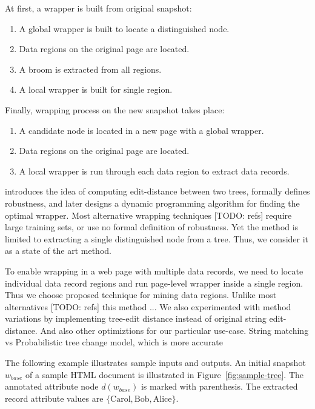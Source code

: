 At first, a wrapper is built from original snapshot:

\begin{enumerate}
	\item A global wrapper is built to locate a distinguished node.
	\item Data regions on the original page are located.
	\item A broom is extracted from all regions.
	\item A local wrapper is built for single region.
\end{enumerate}

Finally, wrapping process on the new snapshot takes place:

\begin{enumerate}
	\item A candidate node is located in a new page with a global wrapper.
	\item Data regions on the original page are located.
	\item A local wrapper is run through each data region to extract data records.
\end{enumerate}

\cite{DBLP:journals/pvldb/ParameswaranDGR11} introduces the idea of computing edit-distance between two trees, formally defines robustness, and later designs a dynamic programming algorithm for finding the optimal wrapper. Most alternative wrapping techniques [TODO: refs] require large training sets, or use no formal definition of robustness. Yet the method is limited to extracting a single distinguished node from a tree. Thus, we consider it as a state of the art method.

To enable wrapping in a web page with multiple data records, we need to locate individual data record regions and run page-level wrapper inside a single region. Thus we choose \cite{liu2009a} proposed technique for mining data regions. Unlike most alternatives [TODO: refs] this method ... We also experimented with method variations by implementing tree-edit distance instead of original string edit-distance. And also other optimiztions for our particular use-case.
String matching vs Probabilistic tree change model, which is more accurate

The following example illustrates sample inputs and outputs. An initial snapshot $w_{base}$ of a sample HTML document is illustrated in Figure~\ref{fig:sample-tree}. The annotated attribute node $d(w_{base})$ is marked with parenthesis. The extracted record attribute values are $\{\text{Carol}, \text{Bob}, \text{Alice}\}$.

